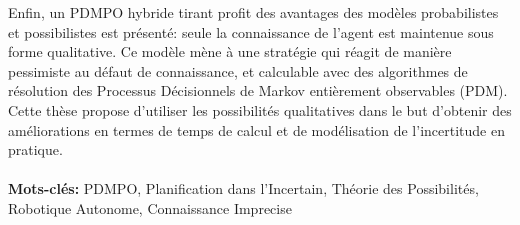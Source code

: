 \documentclass[a4paper,12pt]{article}
\begin{document}
Enfin, un PDMPO hybride 
tirant profit 
des avantages
des mod\`eles probabilistes et possibilistes
est pr\'esent\'e:
seule la connaissance de l'agent
est maintenue 
sous forme qualitative.
Ce mod\`ele m\`ene \`a une strat\'egie
qui r\'eagit de mani\`ere pessimiste
au d\'efaut de connaissance, 
et calculable avec des algorithmes de r\'esolution
des Processus D\'ecisionnels de Markov 
enti\`erement observables (PDM).
Cette th\`ese propose d'utiliser
les possibilit\'es qualitatives
dans le but d'obtenir des am\'eliorations en termes de temps de calcul
et de mod\'elisation de l'incertitude en pratique.\\
\vspace{-0.35cm}
\\
\textbf{Mots-cl\'es:}  PDMPO, Planification dans l'Incertain, Th\'eorie des Possibilit\'es, Robotique Autonome, Connaissance Imprecise
\end{document}
